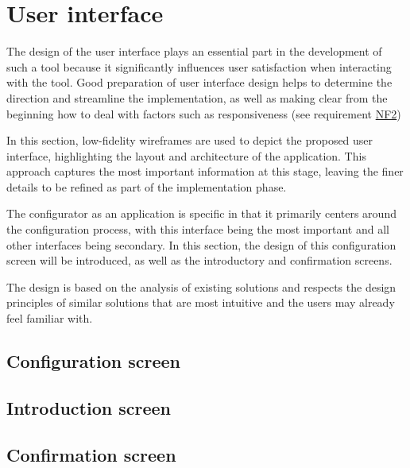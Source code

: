 \section{User interface}

The design of the user interface plays an essential part in the development of such a tool because it significantly influences user satisfaction when interacting with the tool. Good preparation of user interface design helps to determine the direction and streamline the implementation, as well as making clear from the beginning how to deal with factors such as responsiveness (see requirement \hyperref[itm:NF2]{NF2})

In this section, low-fidelity wireframes are used to depict the proposed user interface, highlighting the layout and architecture of the application. This approach captures the most important information at this stage, leaving the finer details to be refined as part of the implementation phase.

The configurator as an application is specific in that it primarily centers around the configuration process, with this interface being the most important and all other interfaces being secondary. In this section, the design of this configuration screen will be introduced, as well as the introductory and confirmation screens.

The design is based on the analysis of existing solutions and respects the design principles of similar solutions that are most intuitive and the users may already feel familiar with.


\subsection{Configuration screen}

\subsection{Introduction screen}


\subsection{Confirmation screen}
